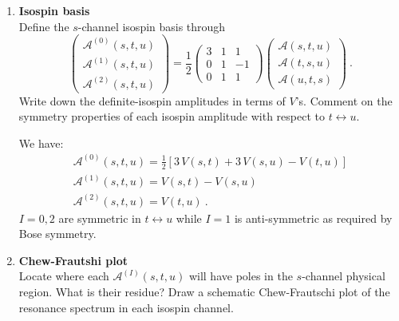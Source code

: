 \begin{enumerate}
    \item \textbf{Isospin basis} \\
          Define the $s$-channel isospin basis through
          \begin{equation}
              \begin{pmatrix}
                  \mathcal{A}^{(0)}(s,t,u) \\
                  \mathcal{A}^{(1)}(s,t,u) \\
                  \mathcal{A}^{(2)}(s,t,u)
              \end{pmatrix}
              =
              \frac{1}{2}\begin{pmatrix}
                  3 & 1 & 1  \\
                  0 & 1 & -1 \\
                  0 & 1 & 1
              \end{pmatrix}
              \begin{pmatrix}
                  \mathcal{A}(s,t,u) \\
                  \mathcal{A}(t,s,u) \\
                  \mathcal{A}(u,t,s)
              \end{pmatrix}
              ~.
          \end{equation}
          Write down the definite-isospin amplitudes in terms of $V$'s. Comment on the symmetry properties of each isospin amplitude with respect to $t \leftrightarrow u$.

          \begin{solution}
              We have:
              \begin{gather}
                  \mathcal{A}^{(0)}(s,t,u) = \frac{1}{2} \left[ 3 \, V(s,t) + 3\,V(s,u) - V(t,u)\right] \\
                  \mathcal{A}^{(1)}(s,t,u) = V(s,t) - V(s,u) \\
                  \mathcal{A}^{(2)}(s,t,u) = V(t,u) ~.
              \end{gather}
              $I=0,2$ are symmetric in $t\leftrightarrow u$ while $I=1$ is anti-symmetric as required by Bose symmetry.
          \end{solution}

    \item \textbf{Chew-Frautshi plot} \\
          Locate where each $\mathcal{A}^{(I)}(s,t,u)$ will have poles in the $s$-channel physical region. What is their residue? Draw a schematic Chew-Frautschi plot of the resonance spectrum in each isospin channel.


\end{enumerate}
